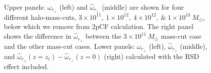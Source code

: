 \documentclass[iop]{emulateapj}
\begin{document}







\begin{figure}
   \caption{\label{fig_sys}
  Upper panels: $\omega_{r_\perp}$ (left) and $\hat{\omega}_{r_\perp}$ (middle) are shown for four different halo-mass-cuts, $3\times 10^{11},~1\times 10^{12},~4\times 10^{12},~\&~1\times 10^{13}~M_\odot$, 
  below which we remove from 2pCF calculation. 
  The right panel shows the difference in $\hat{\omega}_{r_\perp}$ between the $3\times 10^{11}~M_\odot$ mass-cut case and the other mass-cut cases. 
  Lower panels: $\omega_{r_\perp}$ (left), $\hat{\omega}_{r_\perp}$ (middle), and $\hat\omega_{r_\perp}(z=z_i)-\hat\omega_{r_\perp}(z=0)$ (right) calculated with the RSD effect included.
   }
\end{figure}
\end{document}
